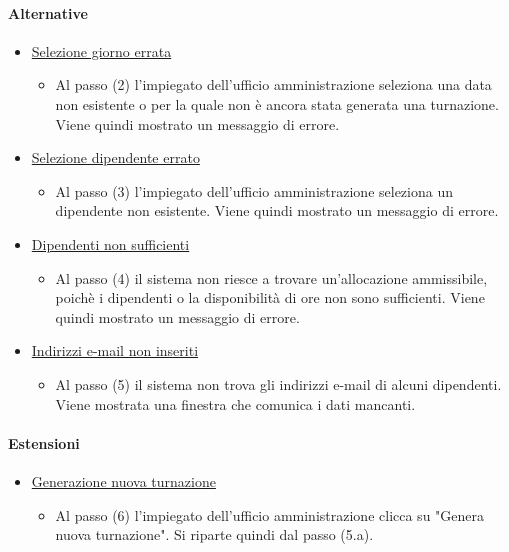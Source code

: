 \paragraph{Alternative}
\begin{itemize}
	\item \underline{Selezione giorno errata}
		\begin{itemize}
			\item Al passo (2) l'impiegato dell'ufficio amministrazione seleziona una data non esistente o per la quale non è ancora stata generata una turnazione. Viene quindi mostrato un messaggio di errore.
		\end{itemize}
	\item \underline{Selezione dipendente errato}
		\begin{itemize}
			\item Al passo (3) l'impiegato dell'ufficio amministrazione seleziona un dipendente non esistente. Viene quindi mostrato un messaggio di errore.
		\end{itemize}
	\item \underline{Dipendenti non sufficienti}
		\begin{itemize}
			\item Al passo (4) il sistema non riesce a trovare un'allocazione ammissibile, poichè i dipendenti o la disponibilità di ore non sono sufficienti. Viene quindi mostrato un messaggio di errore.
		\end{itemize}
	\item \underline{Indirizzi e-mail non inseriti}
		\begin{itemize}
			\item Al passo (5) il sistema non trova gli indirizzi e-mail di alcuni dipendenti. Viene mostrata una finestra che comunica i dati mancanti.
		\end{itemize}
\end{itemize}
\paragraph{Estensioni}
\begin{itemize}
	\item \underline{Generazione nuova turnazione}
		\begin{itemize}
			\item Al passo (6) l'impiegato dell'ufficio amministrazione clicca su "Genera nuova turnazione". Si riparte quindi dal passo (5.a).
		\end{itemize}
\end{itemize}